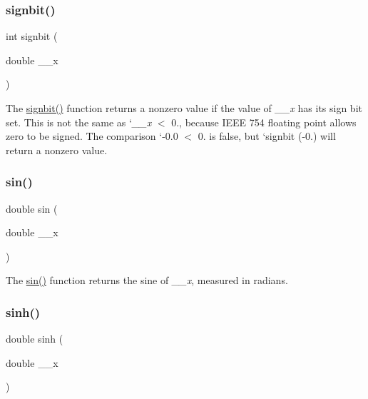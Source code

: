 \subsubsection{\texorpdfstring{signbit()}{signbit()}}
{\footnotesize\ttfamily int signbit (\begin{DoxyParamCaption}\item[{double}]{\+\_\+\+\_\+x }\end{DoxyParamCaption})}

The \hyperlink{group__avr__math_ga630a57ee687f001f8e5a218c9b79f50b}{signbit()} function returns a nonzero value if the value of {\itshape \+\_\+\+\_\+x} has its sign bit set. This is not the same as `{\itshape \+\_\+\+\_\+x} $<$ 0.\textquotesingle{}, because I\+E\+EE 754 floating point allows zero to be signed. The comparison `-\/0.0 $<$ 0.\textquotesingle{} is false, but `signbit (-\/0.)\textquotesingle{} will return a nonzero value. \mbox{\label{group__avr__math_gaaf9cbe0a58b6fd6758e2d977aba46eb5}} 
\subsubsection{\texorpdfstring{sin()}{sin()}}
{\footnotesize\ttfamily double sin (\begin{DoxyParamCaption}\item[{double}]{\+\_\+\+\_\+x }\end{DoxyParamCaption})}

The \hyperlink{group__avr__math_gaaf9cbe0a58b6fd6758e2d977aba46eb5}{sin()} function returns the sine of {\itshape \+\_\+\+\_\+x}, measured in radians. \mbox{\label{group__avr__math_ga00265cea3ae92c52d2aa9cc32f2e6557}} 
\subsubsection{\texorpdfstring{sinh()}{sinh()}}
{\footnotesize\ttfamily double sinh (\begin{DoxyParamCaption}\item[{double}]{\+\_\+\+\_\+x }\end{DoxyParamCaption})}

